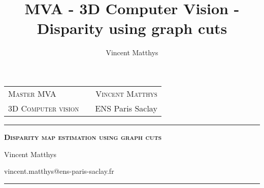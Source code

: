\documentclass[12pt,a4paper,onecolumn]{article}
\title{MVA - 3D Computer Vision - Disparity using graph cuts}
\author{Vincent Matthys}
\begin{document}
\begin{tabularx}{0.9\textwidth}{@{} l X r @{} }
	{\textsc{Master MVA}}       &  & \textsc{Vincent Matthys} \\
	\textsc{3D Computer vision} &  & {ENS Paris Saclay}       \\
\end{tabularx}
\vspace{1.5cm}
\begin{center}

	\rule[11pt]{5cm}{0.5pt}

	\textbf{\LARGE \textsc{Disparity map estimation using graph cuts}}
	\vspace{0.5cm}

	Vincent Matthys

	vincent.matthys@ens-paris-saclay.fr

	\rule{5cm}{0.5pt}

	\vspace{1.5cm}
\end{center}

\tableofcontents
\end{document}
